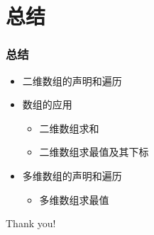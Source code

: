 \section{总结}

\begin{frame}[fragile]
    \frametitle{总结}

    \begin{itemize}
        \item 二维数组的声明和遍历
        \item 数组的应用
            \begin{itemize}
                \item 二维数组求和
                \item 二维数组求最值及其下标
            \end{itemize}
        \item 多维数组的声明和遍历
            \begin{itemize}
                \item 多维数组求最值
            \end{itemize}
    \end{itemize}
\end{frame}

\begin{frame}
    \begin{center}
        {\Huge Thank you!}
    \end{center}
\end{frame}


